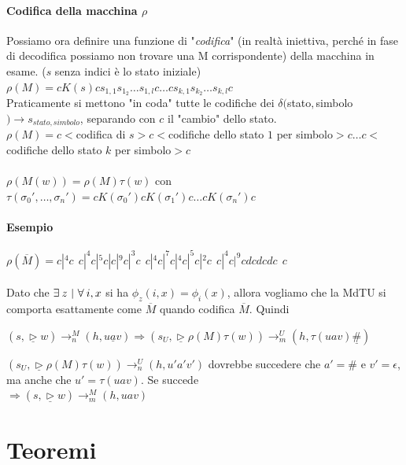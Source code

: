 \documentclass[10pt]{book}
\begin{document}
\paragraph{Codifica della macchina $\rho$} Possiamo ora definire una funzione di "\textit{codifica}" (in realtà iniettiva, perché in fase di decodifica possiamo non trovare una M corrispondente) della macchina in esame. ($s$ senza indici è lo stato iniziale)\\
$\rho(M) = cK(s)cs_{1,1}s_{1_2}\ldots s_{1,l}c\ldots cs_{k,1}s_{k_2}\ldots s_{k,l}c$\\
Praticamente si mettono "in coda" tutte le codifiche dei $\delta($stato$, $simbolo$) \rightarrow s_{stato, simbolo}$, separando con $c$ il "cambio" dello stato.\\
$\rho(M) = c <$codifica di $s>c<$codifiche dello stato $1$ per simbolo$>c\ldots c<$codifiche dello stato $k$ per simbolo$>c$\\\\
$\rho(M(w)) = \rho(M)\tau(w)$ con $\tau(\sigma_0', \ldots, \sigma_n') = cK(\sigma_0')cK(\sigma_1')c\ldots cK(\sigma_n')c$
\paragraph{Esempio} $\rho(\overline{M}) = c|^4c\:\:c|^4c|^5c|c|^9c|^3c\:\:c|^4c|^7c|^4c|^5c|^2c\:\:c|^4c|^9cdcdcdc\:\:c$\\\\
Dato che $\exists\:z\:\:\vline\:\:\forall\:i,x$ si ha $\phi_z(i, x) = \phi_i(x)$, allora vogliamo che la MdTU si comporta esattamente come $\overline{M}$ quando codifica $\overline{M}$. Quindi
\begin{list}{}{}
	\item $(s, \underline{\triangleright}w) \longrightarrow_n^M (h, u\underline{a}v) \Rightarrow (s_U, \underline{\triangleright}\rho(M)\tau(w)) \longrightarrow_m^U (h, \tau(uav)\underline{\#})$
	\item $(s_U, \underline{\triangleright}\rho(M)\tau(w)) \longrightarrow_n^U (h, u'a'v')$ dovrebbe succedere che $a' = \#$ e $v' = \epsilon$, ma anche che $u' = \tau(uav)$. Se succede\\$\Rightarrow (s, \underline{\triangleright}w) \longrightarrow_m^M (h, uav)$
\end{list}
\section{Teoremi}
\end{document}
